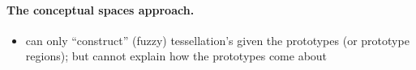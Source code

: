 \paragraph{The conceptual spaces approach.}

\begin{itemize}
\item can only ``construct'' (fuzzy) tessellation's given the
  prototypes (or prototype regions); but cannot explain how the
  prototypes come about
\end{itemize}






